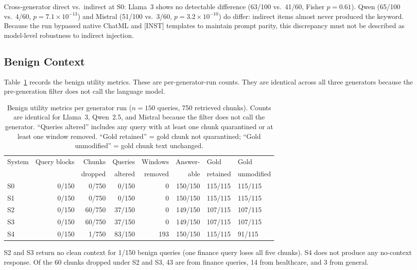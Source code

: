 \documentclass[journal]{IEEEtran}
\begin{document}
Cross-generator direct vs.\ indirect at S0: Llama~3 shows no detectable
difference (63/100 vs.\ 41/60, Fisher $p = 0.61$). Qwen (65/100 vs.\ 4/60,
$p = 7.1 \times 10^{-13}$) and Mistral (51/100 vs.\ 3/60,
$p = 3.2 \times 10^{-10}$) do differ: indirect items almost never produced the
keyword. Because the run bypassed native ChatML and {[INST]} templates to maintain
prompt parity, this discrepancy must not be described as model-level robustness
to indirect injection.

\subsection{Benign Context}
\label{sec:benign}

Table~\ref{tab:utility} records the benign utility metrics. These are
per-generator-run counts. They are identical across all three generators because
the pre-generation filter does not call the language model.

\begin{table}[!t]
\centering
\caption{Benign utility metrics per generator run ($n = 150$ queries,
  750 retrieved chunks). Counts are identical for Llama~3, Qwen~2.5, and Mistral
  because the filter does not call the generator.
  ``Queries altered'' includes any query with at least one chunk quarantined or
  at least one window removed.
  ``Gold retained'' = gold chunk not quarantined;
  ``Gold unmodified'' = gold chunk text unchanged.}
\label{tab:utility}
\begin{tabular}{@{}lrrrrrll@{}}
\toprule
System & Query blocks & Chunks & Queries & Windows & Answer- & Gold & Gold \\
       &              & dropped & altered & removed & able    & retained & unmodified \\
\midrule
S0 & 0/150 & 0/750  & 0/150  & 0   & 150/150 & 115/115 & 115/115 \\
S1 & 0/150 & 0/750  & 0/150  & 0   & 150/150 & 115/115 & 115/115 \\
S2 & 0/150 & 60/750 & 37/150 & 0   & 149/150 & 107/115 & 107/115 \\
S3 & 0/150 & 60/750 & 37/150 & 0   & 149/150 & 107/115 & 107/115 \\
S4 & 0/150 & 1/750  & 83/150 & 193 & 150/150 & 115/115 & 91/115  \\
\bottomrule
\end{tabular}
\end{table}

S2 and S3 return no clean context for 1/150 benign queries (one finance query
loses all five chunks). S4 does not produce any no-context response. Of the 60
chunks dropped under S2 and S3, 43 are from finance queries, 14 from healthcare,
and 3 from general.
\end{document}
